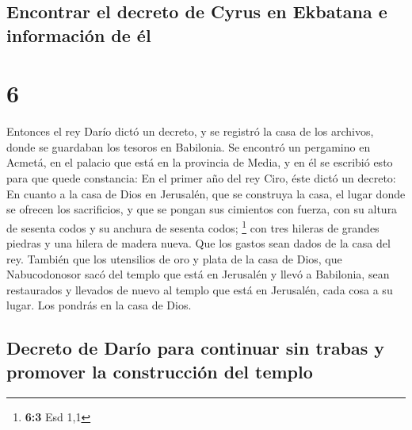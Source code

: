 \begin{paracol}{2}
{\subsection{Encontrar el decreto de Cyrus en Ekbatana e información de
él}\label{encontrar-el-decreto-de-cyrus-en-ekbatana-e-informaciuxf3n-de-uxe9l}}

\hypertarget{section-10}{%
\section{6}\label{section-10}}

 Entonces el rey Darío dictó un decreto, y se registró la
casa de los archivos, donde se guardaban los tesoros en Babilonia.
 Se encontró un pergamino en Acmetá, en el palacio que
está en la provincia de Media, y en él se escribió esto para que quede
constancia:  En el primer año del rey Ciro, éste dictó un
decreto: En cuanto a la casa de Dios en Jerusalén, que se construya la
casa, el lugar donde se ofrecen los sacrificios, y que se pongan sus
cimientos con fuerza, con su altura de sesenta codos y su anchura de
sesenta codos; \footnote{\textbf{6:3} Esd 1,1}  con tres
hileras de grandes piedras y una hilera de madera nueva. Que los gastos
sean dados de la casa del rey.  También que los utensilios
de oro y plata de la casa de Dios, que Nabucodonosor sacó del templo que
está en Jerusalén y llevó a Babilonia, sean restaurados y llevados de
nuevo al templo que está en Jerusalén, cada cosa a su lugar. Los pondrás
en la casa de Dios.

\hypertarget{decreto-de-daruxedo-para-continuar-sin-trabas-y-promover-la-construcciuxf3n-del-templo}{%
\subsection{Decreto de Darío para continuar sin trabas y promover la
construcción del
templo}\label{decreto-de-daruxedo-para-continuar-sin-trabas-y-promover-la-construcciuxf3n-del-templo}}


\end{paracol}
